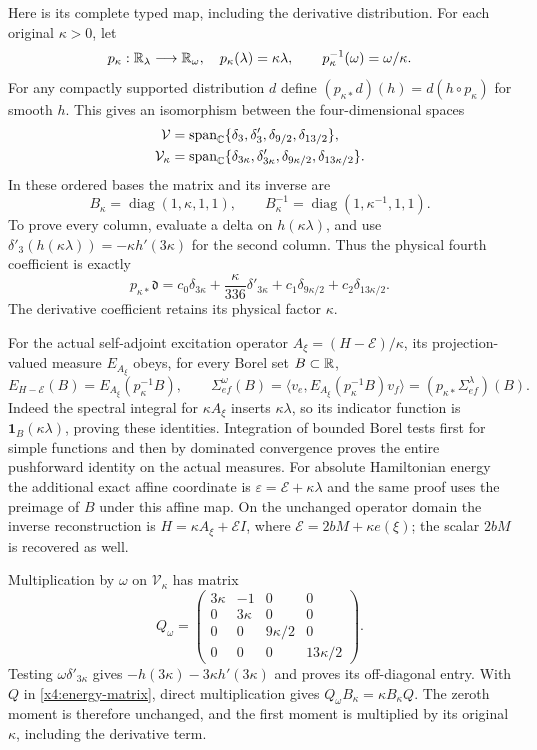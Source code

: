 Here is its complete typed map, including the derivative distribution.
For each original $\kappa>0$, let
\[
p_\kappa:\mathbb R_\lambda\longrightarrow\mathbb R_\omega,
\quad p_\kappa(\lambda)=\kappa\lambda,
\qquad p_\kappa^{-1}(\omega)=\omega/\kappa.
\]
For any compactly supported distribution $d$ define
$(p_{\kappa*}d)(h)=d(h\circ p_\kappa)$ for smooth $h$.
This gives an isomorphism between the four-dimensional spaces
\begin{align*}
\mathcal V&=\operatorname{span}_{\mathbb C}
       \{\delta_3,\delta'_3,\delta_{9/2},\delta_{13/2}\},\\
\mathcal V_\kappa&=\operatorname{span}_{\mathbb C}
       \{\delta_{3\kappa},\delta'_{3\kappa},
                   \delta_{9\kappa/2},\delta_{13\kappa/2}\}.
\end{align*}
In these ordered bases the matrix and its inverse are
\[
B_\kappa=\operatorname{diag}(1,\kappa,1,1),\qquad
B_\kappa^{-1}=\operatorname{diag}(1,\kappa^{-1},1,1).
\]
To prove every column, evaluate a delta on $h(\kappa\lambda)$,
and use
$\delta'_3(h(\kappa\lambda))=-\kappa h'(3\kappa)$
for the second column. Thus the physical fourth coefficient is exactly
\begin{equation}
p_{\kappa*}\mathfrak d
=c_0\delta_{3\kappa}+\frac{\kappa}{336}\delta'_{3\kappa}
  +c_1\delta_{9\kappa/2}+c_2\delta_{13\kappa/2}.
\label{x4:physical-distribution}
\end{equation}
The derivative coefficient retains its physical factor $\kappa$.

For the actual self-adjoint excitation operator
$A_\xi=(H-\mathcal E)/\kappa$, its projection-valued measure
$E_{A_\xi}$ obeys, for every Borel set $B\subset\mathbb R$,
\[
E_{H-\mathcal E}(B)=E_{A_\xi}(p_\kappa^{-1}B),\qquad
\Sigma^\omega_{ef}(B)
=\langle v_e,E_{A_\xi}(p_\kappa^{-1}B)v_f\rangle
=(p_{\kappa*}\Sigma^\lambda_{ef})(B).
\]
Indeed the spectral integral for $\kappa A_\xi$ inserts
$\kappa\lambda$, so its indicator function is
$\mathbf1_B(\kappa\lambda)$, proving these identities. Integration
of bounded Borel tests first for simple functions and then by dominated
convergence proves the entire pushforward identity on the actual measures.
For absolute Hamiltonian energy the additional exact affine coordinate
is $\varepsilon=\mathcal E+\kappa\lambda$ and the same proof uses
the preimage of $B$ under this affine map. On the unchanged operator
domain the inverse reconstruction is
$H=\kappa A_\xi+\mathcal E I$, where
$\mathcal E=2bM+\kappa e(\xi)$; the scalar $2bM$ is recovered as well.

Multiplication by $\omega$ on $\mathcal V_\kappa$ has matrix
\[
Q_\omega=\begin{pmatrix}
3\kappa&-1&0&0\\0&3\kappa&0&0\\
0&0&9\kappa/2&0\\0&0&0&13\kappa/2
\end{pmatrix}.
\]
Testing $\omega\delta'_{3\kappa}$ gives
$-h(3\kappa)-3\kappa h'(3\kappa)$ and proves its off-diagonal
entry. With $Q$ in \eqref{x4:energy-matrix}, direct multiplication
gives $Q_\omega B_\kappa=\kappa B_\kappa Q$.
The zeroth moment is therefore unchanged, and the first moment
is multiplied by its original $\kappa$, including the derivative term.
